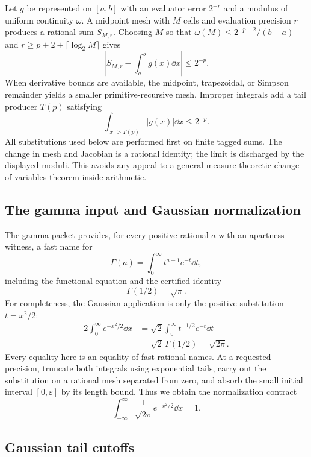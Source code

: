 Let $g$ be represented on $[a,b]$ with an evaluator error $2^{-r}$ and a modulus of uniform continuity $\omega$.  A midpoint mesh with $M$ cells and evaluation precision $r$ produces a rational sum $S_{M,r}$.  Choosing $M$ so that $\omega(M)\le2^{-p-2}/(b-a)$ and $r\ge p+2+\lceil\log_2 M\rceil$ gives
\[
  \left|S_{M,r}-\int_a^b g(x)\dd x\right|\le2^{-p}.
\]
When derivative bounds are available, the midpoint, trapezoidal, or Simpson remainder yields a smaller primitive-recursive mesh.  Improper integrals add a tail producer $T(p)$ satisfying
\[
  \int_{|x|>T(p)} |g(x)|\dd x\le2^{-p}.
\]
All substitutions used below are performed first on finite tagged sums.  The change in mesh and Jacobian is a rational identity; the limit is discharged by the displayed moduli.  This avoids any appeal to a general measure-theoretic change-of-variables theorem inside arithmetic.

\subsection{The gamma input and Gaussian normalization}

The gamma packet provides, for every positive rational $a$ with an apartness witness, a fast name for
\[
 \Gamma(a)=\int_0^\infty t^{a-1}e^{-t}\dd t,
\]
including the functional equation and the certified identity
\begin{equation}\label{eq:gamma-half}
 \Gamma(1/2)=\sqrt\pi.
\end{equation}
For completeness, the Gaussian application is only the positive substitution $t=x^2/2$:
\begin{align*}
 2\int_0^\infty e^{-x^2/2}\dd x
 &=\sqrt2\int_0^\infty t^{-1/2}e^{-t}\dd t\\
 &=\sqrt2\,\Gamma(1/2)=\sqrt{2\pi}.
\end{align*}
Every equality here is an equality of fast rational names.  At a requested precision, truncate both integrals using exponential tails, carry out the substitution on a rational mesh separated from zero, and absorb the small initial interval $[0,\varepsilon]$ by its length bound.  Thus we obtain the normalization contract
\begin{equation}\label{eq:gaussian-normalization}
 \int_{-\infty}^{\infty}\frac{1}{\sqrt{2\pi}}e^{-x^2/2}\dd x=1.
\end{equation}

\subsection{Gaussian tail cutoffs}

